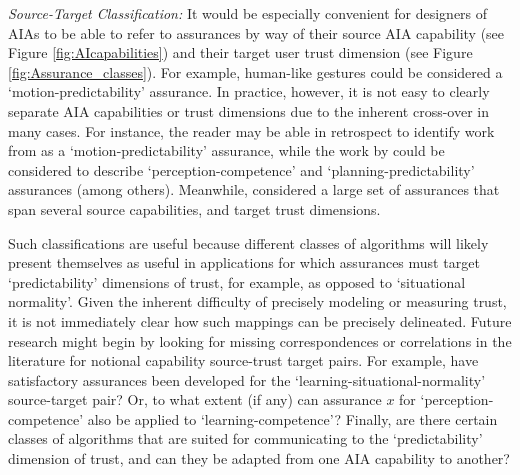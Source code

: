 \emph{Source-Target Classification:}
It would be especially convenient for designers of AIAs to be able to refer to assurances by way of their source AIA capability (see Figure \ref{fig:AIcapabilities}) and their target user trust dimension (see Figure \ref{fig:Assurance_classes}). 
For example, human-like gestures could be considered a `motion-predictability' assurance. In practice, however, it is not easy to clearly separate AIA capabilities or trust dimensions due to the inherent cross-over in many cases. For instance, the reader may be able in retrospect to identify work from \cite{Dragan2013-wd} as a `motion-predictability' assurance, while the work by \citet{Wang2016-id} could be considered to describe `perception-competence' and `planning-predictability' assurances (among others). Meanwhile, \citet{Aitken2016-fb} considered a large set of assurances that span several source capabilities, and target trust dimensions. 

Such classifications are useful because different classes of algorithms will likely present themselves as useful in applications for which assurances must target `predictability' dimensions of trust, for example, as opposed to `situational normality'. 
Given the inherent difficulty of precisely modeling or measuring trust, it is not immediately clear how such mappings can be precisely delineated.  
Future research might begin by looking for missing correspondences or correlations in the literature for notional capability source-trust target pairs. For example, have satisfactory assurances been developed for the `learning-situational-normality' source-target pair? Or, to what extent (if any) can assurance $x$ for `perception-competence' also be applied to `learning-competence'? Finally, are there certain classes of algorithms that are suited for communicating to the `predictability' dimension of trust, and can they be adapted from one AIA capability to another?
